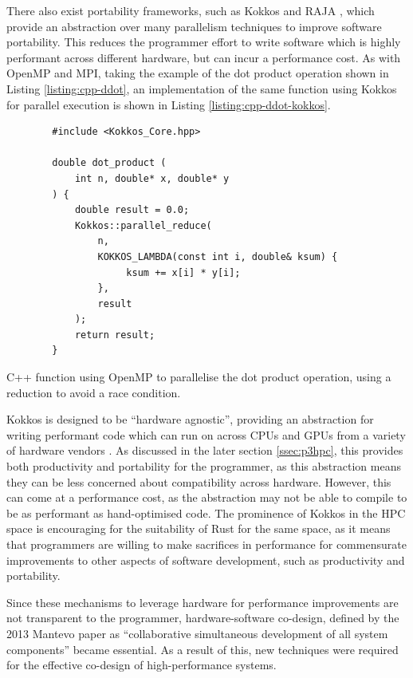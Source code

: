 There also exist portability frameworks, such as Kokkos \cite{edwardsKokkosEnablingPerformance2013} and RAJA \cite{RAJAPortabilitySuite}, which provide an abstraction over many parallelism techniques to improve software portability. This reduces the programmer effort to write software which is highly performant across different hardware, but can incur a performance cost. As with OpenMP and MPI, taking the example of the dot product operation shown in Listing \ref{listing:cpp-ddot}, an implementation of the same function using Kokkos for parallel execution is shown in Listing \ref{listing:cpp-ddot-kokkos}.

\begin{listing}[H]
    \begin{verbatim}
        #include <Kokkos_Core.hpp>
        
        double dot_product (
            int n, double* x, double* y
        ) {
            double result = 0.0;
            Kokkos::parallel_reduce(
                n,
                KOKKOS_LAMBDA(const int i, double& ksum) {
                     ksum += x[i] * y[i];
                },
                result
            );
            return result;
        }
    \end{verbatim}
    \caption{C++ function using OpenMP to parallelise the dot product operation, using a reduction to avoid a race condition.}
    \label{listing:cpp-ddot-kokkos}
\end{listing}

Kokkos is designed to be ``hardware agnostic'', providing an abstraction for writing performant code which can run on across CPUs and GPUs from a variety of hardware vendors \cite{KokkosEcosystem}. As discussed in the later section \ref{ssec:p3hpc}, this provides both productivity and portability for the programmer, as this abstraction means they can be less concerned about compatibility across hardware. However, this can come at a performance cost, as the abstraction may not be able to compile to be as performant as hand-optimised code. The prominence of Kokkos in the \acrshort{HPC} space is encouraging for the suitability of Rust for the same space, as it means that programmers are willing to make sacrifices in performance for commensurate improvements to other aspects of software development, such as productivity and portability.

Since these mechanisms to leverage hardware for performance improvements are not transparent to the programmer, hardware-software co-design, defined by the 2013 Mantevo paper as ``collaborative simultaneous development of all system components'' \cite{heroux2013mantevo} became essential. As a result of this, new techniques were required for the effective co-design of high-performance systems.

